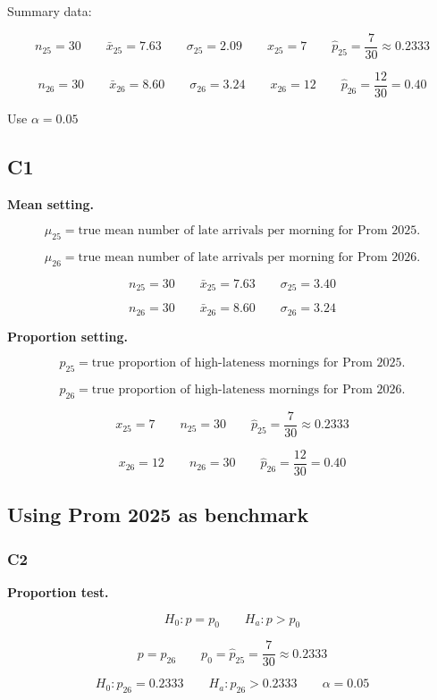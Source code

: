 \documentclass[12pt]{article}
\begin{document}
	Summary data:
	
	\[
	n_{25}=30
	\qquad
	\bar{x}_{25}=7.63
	\qquad
	\sigma_{25}=2.09
	\qquad
	x_{25}=7
	\qquad
	\hat{p}_{25}=\frac{7}{30}\approx 0.2333
	\]
	
	\[
	n_{26}=30
	\qquad
	\bar{x}_{26}=8.60
	\qquad
	\sigma_{26}=3.24
	\qquad
	x_{26}=12
	\qquad
	\hat{p}_{26}=\frac{12}{30}=0.40
	\]
	
	Use \(\alpha=0.05\)
	
	\subsection*{C1}
	
	\textbf{Mean setting.}
	
	\[
	\mu_{25}=\text{true mean number of late arrivals per morning for Prom 2025.}
	\]
	
	\[
	\mu_{26}=\text{true mean number of late arrivals per morning for Prom 2026.}
	\]
	
	\[
	n_{25}=30
	\qquad
	\bar{x}_{25}=7.63
	\qquad
	\sigma_{25}=3.40
	\]
	
	\[
	n_{26}=30
	\qquad
	\bar{x}_{26}=8.60
	\qquad
	\sigma_{26}=3.24
	\]
	
	\textbf{Proportion setting.}
	
	\[
	p_{25}=\text{true proportion of high-lateness mornings for Prom 2025.}
	\]
	
	\[
	p_{26}=\text{true proportion of high-lateness mornings for Prom 2026.}
	\]
	
	\[
	x_{25}=7
	\qquad
	n_{25}=30
	\qquad
	\hat{p}_{25}=\frac{7}{30}\approx 0.2333
	\]
	
	\[
	x_{26}=12
	\qquad
	n_{26}=30
	\qquad
	\hat{p}_{26}=\frac{12}{30}=0.40
	\]
	
	\subsection*{Using Prom 2025 as benchmark}
	
	\subsubsection*{C2}
	
	\textbf{Proportion test.}
	
	\[
	H_0\colon p=p_0
	\qquad
	H_a\colon p>p_0
	\]
	
	\[
	p=p_{26}
	\qquad
	p_0=\hat{p}_{25}=\frac{7}{30}\approx 0.2333
	\]
	
	\[
	H_0\colon p_{26}=0.2333
	\qquad
	H_a\colon p_{26}>0.2333 
	\qquad
	\alpha=0.05
	\]
	
\end{document}
